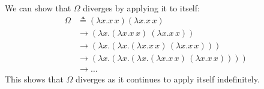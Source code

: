   \begin{Example}

    \noindent
    We can show that \(\Omega\) diverges by applying it to itself:
    \begin{align*}
      \Omega &\triangleq (\lambda x. x\,x)(\lambda x. x\,x) \\
      &\rightarrow (\lambda x. (\lambda x. x\,x)\ (\lambda x. x\,x)) \\
      &\rightarrow (\lambda x. (\lambda x. (\lambda x. x\,x)\,(\lambda x. x\,x))) \\
      &\rightarrow (\lambda x. (\lambda x. (\lambda x. (\lambda x. x\,x)\,(\lambda x. x\,x)))) \\
      &\rightarrow \ldots
    \end{align*}
    \noindent
    This shows that \(\Omega\) diverges as it continues to apply itself indefinitely.
\end{Example}

\newpage 

